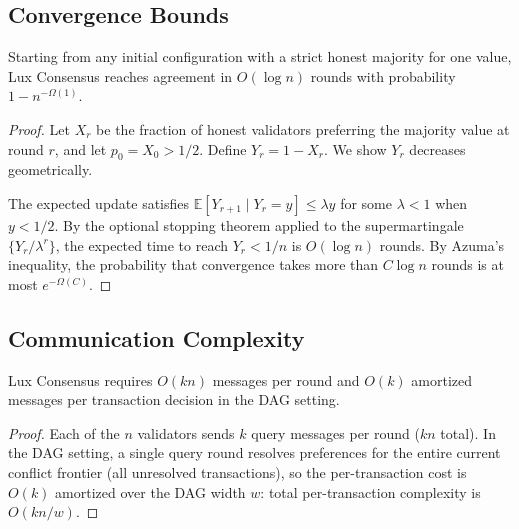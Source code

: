 \subsection{Convergence Bounds}

\begin{theorem}
\label{thm:convergence}
Starting from any initial configuration with a strict honest majority for one value,
Lux Consensus reaches agreement in $O(\log n)$ rounds with probability
$1 - n^{-\Omega(1)}$.
\end{theorem}

\begin{proof}
Let $X_r$ be the fraction of honest validators preferring the majority value at round $r$,
and let $p_0 = X_0 > 1/2$. Define $Y_r = 1 - X_r$. We show $Y_r$ decreases geometrically.

The expected update satisfies $\mathbb{E}[Y_{r+1} \mid Y_r = y] \leq \lambda y$ for some
$\lambda < 1$ when $y < 1/2$. By the optional stopping theorem applied to the
supermartingale $\{Y_r / \lambda^r\}$, the expected time to reach $Y_r < 1/n$ is
$O(\log n)$ rounds. By Azuma's inequality, the probability that convergence takes more
than $C \log n$ rounds is at most $e^{-\Omega(C)}$.
\end{proof}

\subsection{Communication Complexity}

\begin{proposition}
\label{prop:comm}
Lux Consensus requires $O(kn)$ messages per round and $O(k)$ amortized messages per
transaction decision in the DAG setting.
\end{proposition}

\begin{proof}
Each of the $n$ validators sends $k$ query messages per round ($kn$ total). In the DAG
setting, a single query round resolves preferences for the entire current conflict frontier
(all unresolved transactions), so the per-transaction cost is $O(k)$ amortized over the
DAG width $w$: total per-transaction complexity is $O(kn/w)$.
\end{proof}


